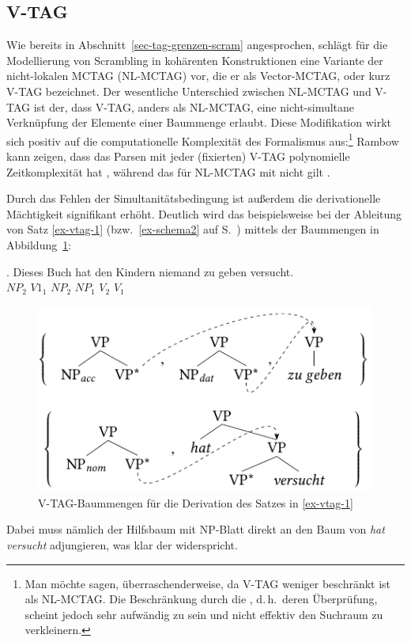 \subsection{V-TAG}\label{sec-tag-varianten-vtag}

\largerpage%
Wie bereits in Abschnitt~\ref{sec-tag-grenzen-scram} angesprochen, schlägt \cite{Rambow:94} für die Modellierung von Scrambling in kohärenten Konstruktionen eine Variante der nicht-lokalen MCTAG (NL-MCTAG) vor, die er als Vector-MCTAG, oder kurz V-TAG bezeichnet. Der wesentliche Unterschied zwischen NL-MCTAG und V-TAG ist der, dass V-TAG, anders als NL-MCTAG, eine nicht-simultane Verknüpfung der Elemente einer Baummenge erlaubt. Diese Modifikation wirkt sich positiv auf die computationelle Komplexität des Formalismus aus:\footnote{Man möchte sagen, überraschenderweise, da V-TAG weniger beschränkt ist als NL-MCTAG. Die Beschränkung durch die , d.\,h.\ deren Überprüfung, scheint jedoch sehr aufwändig zu sein und nicht effektiv den Suchraum zu verkleinern.} Rambow kann zeigen, dass das Parsen mit jeder (fixierten) V-TAG polynomielle Zeitkomplexität hat \citep[120ff]{Rambow:94}, während das für NL-MCTAG mit  nicht gilt \citep{Rambow:Satta:92,Champollion:11a}.
\largerpage%

Durch das Fehlen der Simultanitätsbedingung ist au\ss erdem die derivationelle Mächtigkeit signifikant erhöht. Deutlich wird das beispielsweise bei der Ableitung von Satz \ref{ex-vtag-1} (bzw.\ \ref{ex-schema2} auf S.~\pageref{ex-schema2}) mittels der Baummengen in Abbildung~\ref{fig-vtag-1}:

\exg. {Dieses Buch} hat {den Kindern} niemand {zu geben} versucht.  \\
$\mathit{NP}_2$ $V1_1$ $\mathit{NP}_2$ $\mathit{NP}_1$ $V_2$ $V_1$ \\
\citep[42]{Rambow:94} \label{ex-vtag-1}

\begin{figure}[t]
\centering
\includegraphics{graphics/abb66.pdf}
\caption{V-TAG-Baummengen für die Derivation des Satzes in \ref{ex-vtag-1}\label{fig-vtag-1}}
\end{figure}
Dabei muss nämlich der Hilfsbaum mit NP\subnom-Blatt direkt an den Baum von {\it hat versucht} adjungieren, was klar der  widerspricht.

